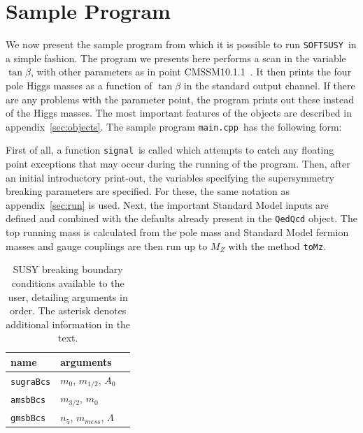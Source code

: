 \documentclass{article}
\def\SOFTSUSY{{\tt SOFTSUSY}}
\def\code#1{\small{\tt #1}\normalsize}
\begin{document}
\section{Sample Program \label{sec:prog}}
We now present the sample program from which it is possible to run
\SOFTSUSY~in a simple fashion. The program we presents here performs a scan in
the variable $\tan \beta$, with other parameters as in point
CMSSM10.1.1~\cite{bench}. 
It then prints the four pole Higgs masses as a function of $\tan \beta$ in the
standard output channel. If there are any problems with the parameter point,
the program prints out these instead of the Higgs masses.
The most important features of the objects are 
described in appendix~\ref{sec:objects}.
The sample program \code{main.cpp}~has the following form: 
\small

\normalsize
First of all, a function \code{signal}~is called which attempts to catch any floating point
exceptions that may occur during the running of the program. 
Then, after an initial introductory print-out, the variables specifying the
supersymmetry breaking parameters are specified. For these, the same notation
as appendix~\ref{sec:run} is used. Next, the important Standard Model inputs
are defined and combined with the defaults already present in the
\code{QedQcd} object. The top running mass is calculated from the pole mass
and 
Standard Model fermion masses and gauge couplings are
then run up to $M_Z$ with the method \code{toMz}.

\begin{table}\begin{center}
\begin{tabular}[l]{lll} name & arguments \\ 
\hline
\code{sugraBcs} & $m_0$, $m_{1/2}$, $A_0$ \\
\code{amsbBcs} & $m_{3/2}$, $m_0$ \\
\code{gmsbBcs} & $n_5$, $m_{mess}$, $\Lambda$ \\
\end{tabular}\caption{\label{bcs} SUSY breaking boundary conditions available to the user, detailing arguments
in order. The asterisk denotes additional information in the text.}\end{center}\end{table}
\end{document}
